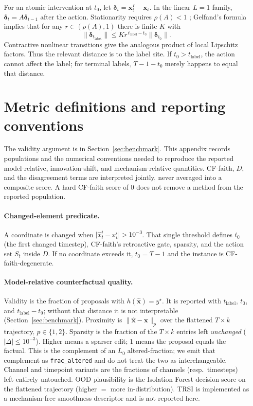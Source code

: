 \documentclass{article}
\newcommand{\bx}{\mathbf{x}}
\begin{document}
For an atomic intervention at $t_0$, let $\boldsymbol{\delta}_t=\bx_t^I-\bx_t$.  In the linear $L=1$ family, $\boldsymbol{\delta}_t=A\boldsymbol{\delta}_{t-1}$ after the action. Stationarity requires $\rho(A)<1$ \citep{lutkepohl2005}; Gelfand's formula implies that for any $r\in(\rho(A),1)$ there is finite $K$ with
\begin{equation}
  \|\boldsymbol{\delta}_{t_{\mathrm{label}}}\|
  \leq K r^{\,t_{\mathrm{label}}-t_0}
      \|\boldsymbol{\delta}_{t_0}\|.
  \label{eq:horizon-decay}
\end{equation}
Contractive nonlinear transitions give the analogous product of local Lipschitz factors.  Thus the relevant distance is to the label site.  If $t_0>t_{\mathrm{label}}$, the action cannot affect the label; for terminal labels, $T-1-t_0$ merely happens to equal that distance.

\section{Metric definitions and reporting conventions}
\label{app:metrics}

The validity argument is in Section~\ref{sec:benchmark}.  This appendix records populations and the numerical conventions needed to reproduce the reported model-relative, innovation-shift, and mechanism-relative quantities.  CF-faith, $D$, and the disagreement terms are interpreted jointly, never averaged into a composite score.  A hard CF-faith score of $0$ does not remove a method from the reported population.

\paragraph{Changed-element predicate.}
A coordinate is changed when $\lvert\hat{x}_t^i-x_t^i\rvert>10^{-3}$.  That single threshold defines $t_0$ (the first changed timestep), CF-faith's retroactive gate, sparsity, and the action set $S_t$ inside $D$.  If no coordinate exceeds it, $t_0=T-1$ and the instance is CF-faith-degenerate.

\paragraph{Model-relative counterfactual quality.}
Validity is the fraction of proposals with $h(\hat{\bx})=y^\star$.  It is reported with $t_{\mathrm{label}}$, $t_0$, and $t_{\mathrm{label}}-t_0$; without that distance it is not interpretable (Section~\ref{sec:benchmark}).  Proximity is $\lVert\hat{\bx}-\bx\rVert_p$ over the flattened $T\times k$ trajectory, $p\in\{1,2\}$.  Sparsity is the fraction of the $T\times k$ entries left \emph{unchanged} ($\lvert\Delta\rvert\le 10^{-3}$).  Higher means a sparser edit; $1$ means the proposal equals the factual.  This is the complement of an $L_0$ altered-fraction; we emit that complement as \texttt{frac\_altered} and do not treat the two as interchangeable.  Channel and timepoint variants are the fractions of channels (resp.\ timesteps) left entirely untouched.  OOD plausibility is the Isolation Forest decision score on the flattened trajectory (higher $=$ more in-distribution).  TRSI is implemented as a mechanism-free smoothness descriptor and is not reported here.
\end{document}
